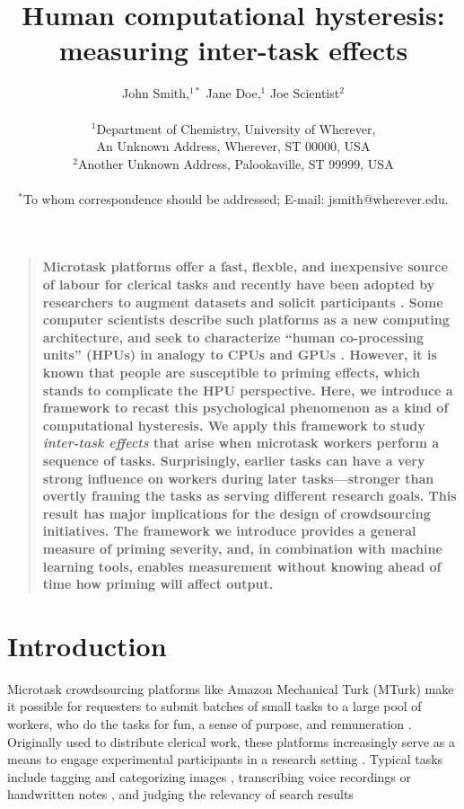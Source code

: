 \documentclass[12pt]{article}
\title{Human computational hysteresis: measuring inter-task effects}
\author
{John Smith,$^{1\ast}$ Jane Doe,$^{1}$ Joe Scientist$^{2}$\\
\\
\normalsize{$^{1}$Department of Chemistry, University of Wherever,}\\
\normalsize{An Unknown Address, Wherever, ST 00000, USA}\\
\normalsize{$^{2}$Another Unknown Address, Palookaville, ST 99999, USA}\\
\\
\normalsize{$^\ast$To whom correspondence should be addressed; E-mail:  jsmith@wherever.edu.}
}
\date{}
\newenvironment{sciabstract}{%
\begin{quote} \bf}
{\end{quote}}
\begin{document}
 


\baselineskip24pt


\maketitle 




\begin{sciabstract}
Microtask platforms offer a fast, flexble, and inexpensive source of labour for
clerical tasks \cite{Finnerty2013, chandler2013breaking, Berinsky2012351} and 
recently have been adopted by researchers to augment datasets and solicit 
participants \cite{paolacci2010running, Berinsky2012351, chandler2013breaking}.
Some computer scientists describe such platforms as a new computing 
architecture, and seek to characterize “human co-processing units” (HPUs) in 
analogy to CPUs and GPUs \cite{5543192}. However, it is known that people are 
susceptible to 
priming effects\cite{No2007,Swaab200299,Gopher2000308,sohn2001task,Ghuman17062008,BJOP1796,BJOP1826,Gass1999549}, which stands to complicate the HPU 
perspective.  Here, we introduce a framework to recast this psychological 
phenomenon as a kind of computational hysteresis. 
We apply this framework to study \textit{inter-task effects} that arise when 
microtask 
workers perform a sequence of tasks. Surprisingly, earlier tasks can have a 
very strong influence on workers during later tasks---stronger than overtly
framing the tasks as serving different research goals.   
This result has major implications for the design of crowdsourcing initiatives.
The framework we introduce provides a general measure of priming severity, 
and, in combination with machine learning tools, enables measurement without
knowing ahead of time how priming will affect output.
\end{sciabstract}

\section*{Introduction}
Microtask crowdsourcing platforms like Amazon Mechanical Turk (MTurk) make it 
possible for requesters to submit batches of small tasks to a large pool of 
workers, who do the tasks for fun, a sense of purpose, and remuneration 
\cite{kazai2013analysis,Antin20122925}.  
Originally used to distribute clerical work, these platforms 
increasingly serve as a means to engage experimental 
participants in a research 
setting \cite{paolacci2010running,Berinsky2012351,snow2008cheap,alonso2009can}.
Typical tasks include tagging and categorizing images 
\cite{6116320,Zhai2012357}, transcribing voice recordings 
\cite{chandler2013breaking,paolacci2010running}
or handwritten notes \cite{Berinsky2012351,Finnerty2013}, and judging the 
relevancy of search results \cite{le2010ensuring,grady2010crowdsourcing,alonso2009can,kazai2013analysis}
\end{document}
